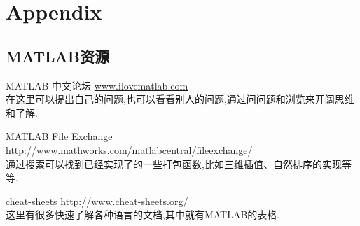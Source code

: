 \appendix
\section{Appendix}

\subsection{MATLAB资源}
\begin{itemize*}
    \item MATLAB 中文论坛 \url{www.ilovematlab.com}\\
          在这里可以提出自己的问题,也可以看看别人的问题,通过问问题和浏览来开阔思维和了解.                  
    \item MATLAB File Exchange 
                      \url{http://www.mathworks.com/matlabcentral/fileexchange/}\\
          通过搜索可以找到已经实现了的一些打包函数,比如三维插值、自然排序的实现等等.
    \item cheat-sheets \url{http://www.cheat-sheets.org/}\\
          这里有很多快速了解各种语言的文档,其中就有MATLAB的表格.
\end{itemize*}
